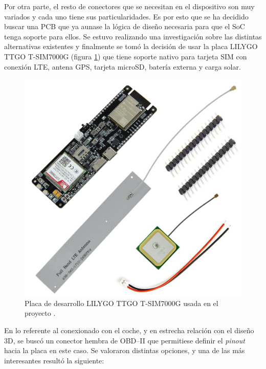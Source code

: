 Por otra parte, el resto de conectores que se necesitan en el dispositivo son muy
variados y cada uno tiene sus particularidades. Es por esto que se ha decidido
buscar una PCB que ya aunase la lógica de diseño necesaria para que el \ac{SoC}
tenga soporte para ellos. Se estuvo realizando una investigación sobre las
distintas alternativas existentes y finalmente se tomó la decisión de usar la
placa LILYGO TTGO T-SIM7000G (figura \ref{fig:lilygo}) que tiene soporte nativo
para tarjeta SIM con conexión \ac{LTE}, antena \ac{GPS}, tarjeta microSD, batería
externa y carga solar.

\begin{figure}[H]
  \centering
  \includegraphics[width=\linewidth]{images/lilygo-tsim7000g.jpg}
  \caption{Placa de desarrollo LILYGO TTGO T-SIM7000G usada en el proyecto \cite{4269LILYGO}.}
  \label{fig:lilygo}
\end{figure}

En lo referente al conexionado con el coche, y en estrecha relación con el diseño 3D,
se buscó un conector hembra de \ac{OBD}--II que permitiese definir el \textit{pinout}
hacia la placa en este caso. Se valoraron distintas opciones, y una de las más
interesantes resultó la siguiente:


